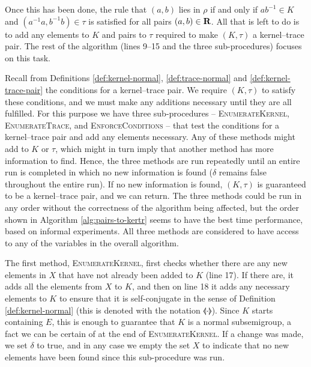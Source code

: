 Once this has been done, the rule that $(a,b)$ lies in $\rho$ if and only if
$ab^{-1} \in K$ and $(a^{-1}a, b^{-1}b) \in \tau$ is satisfied for all pairs
$(a,b) \in \mathbf{R}$.  All that is left to do is to add any elements to $K$
and pairs to $\tau$ required to make $(K, \tau)$ a kernel--trace pair.  The rest
of the algorithm (lines 9--15 and the three sub-procedures) focuses on this task.

Recall from Definitions \ref{def:kernel-normal}, \ref{def:trace-normal} and
\ref{def:kernel-trace-pair} the conditions for a kernel--trace pair.  We require
$(K, \tau)$ to satisfy these conditions, and we must make any additions
necessary until they are all fulfilled.  For this purpose we have three
sub-procedures -- \textsc{EnumerateKernel}, \textsc{EnumerateTrace}, and
\textsc{EnforceConditions} -- that test the conditions for a kernel--trace pair
and add any elements necessary.  Any of these methods might add to $K$ or
$\tau$, which might in turn imply that another method has more information to
find.  Hence, the three methods are run repeatedly until an entire run is
completed in which no new information is found ($\delta$ remains false
throughout the entire run).  If no new information is found,
$(K, \tau)$ is guaranteed to be a kernel--trace pair, and we can return.  The
three methods could be run in any order without the correctness of the algorithm
being affected, but the order shown in Algorithm \ref{alg:pairs-to-kertr} seems
to have the best time performance, based on informal experiments.  All three
methods are considered to have access to any of the variables in the overall
algorithm.

The first method, \textsc{EnumerateKernel}, first checks whether there are any
new elements in $X$ that have not already been added to $K$ (line 17).  If there
are, it adds all the elements from $X$ to $K$, and then on line 18 it adds any
necessary elements to $K$ to ensure that it is self-conjugate in the sense of
Definition \ref{def:kernel-normal} (this is denoted with the notation
$\llangle \cdot \rrangle$).  Since $K$ starts containing $E$, this is enough to
guarantee that $K$ is a normal subsemigroup, a fact we can be certain of at the
end of \textsc{EnumerateKernel}.  If a change was made, we set $\delta$ to true,
and in any case we empty the set $X$ to indicate that no new elements have been
found since this sub-procedure was run.

